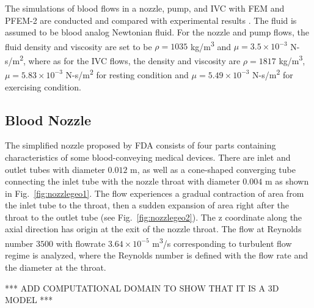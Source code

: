 The simulations of blood flows in a nozzle, pump, and IVC with FEM and PFEM-2 are conducted and compared with experimental results \cite{fda_res,fda_nozzle ,fda_pump,gallagher_exp}. The fluid is assumed to be blood analog Newtonian fluid. For the nozzle and pump flows, the fluid density and viscosity are set to be $\rho= 1035$ kg/m\textsuperscript{3} and $\mu =3.5\times10^{-3}$ N-s/m\textsuperscript{2}, where as for the IVC flows, the density and viscosity are $\rho=1817$ kg/m\textsuperscript{3}, $\mu=5.83\times10^{-3}$ N-s/m\textsuperscript{2} for resting condition and $\mu=5.49\times10^{-3}$ N-s/m\textsuperscript{2} for exercising condition. 

\subsection{Blood Nozzle}

The simplified nozzle proposed by FDA consists of four parts containing characteristics of some blood-conveying medical devices. There are inlet and outlet tubes with diameter $0.012$ m, as well as a cone-shaped converging tube connecting the inlet tube with the nozzle throat with diameter $0.004$ m as shown in Fig.~\ref{fig:nozzlegeo1}. The flow experiences a gradual contraction of area from the inlet tube to the throat, then a sudden expansion of area right after the throat to the outlet tube (see Fig.~\ref{fig:nozzlegeo2}). The z coordinate along the axial direction has origin at the exit of the nozzle throat. The flow at Reynolds number $3500$ with flowrate $3.64\times10^{-5}$ m\textsuperscript{3}/s corresponding to turbulent flow regime is analyzed, where the Reynolds number is defined with the flow rate and the diameter at the throat. 

*** ADD COMPUTATIONAL DOMAIN TO SHOW THAT IT IS A 3D MODEL ***

